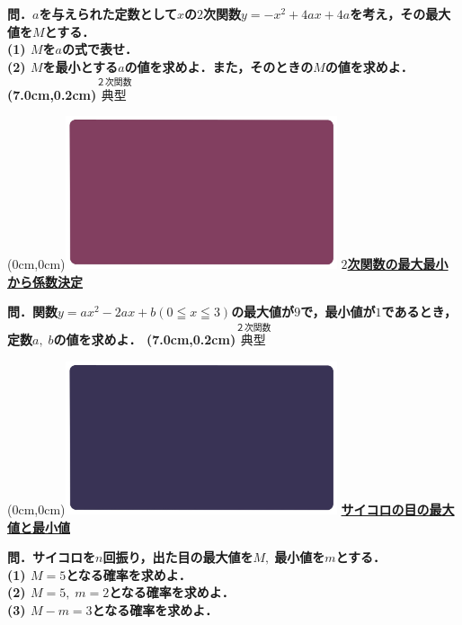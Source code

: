 \documentclass[10pt,
fleqn,
dvipdfmx,
uplatex
]{jsarticle}
\begin{document}
\normalsize 
\bf\boldmath 問．$a$を与えられた定数として$x$の$2$次関数$y=-x^2+4ax+4a$を考え，その最大値を$M$とする．\\
(1)  $M$を$a$の式で表せ．\\
(2)  $M$を最小とする$a$の値を求めよ．また，そのときの$M$の値を求めよ．\\

\at(7.0cm,0.2cm){\small\color{bradorange}$\overset{\text{２次関数}}{\text{典型}}$}


\newpage



\at(0cm,0cm){\includegraphics[width=8cm,bb=0 0 1920 1080]{./youtube/thumbnails/templates/smart_background/２次関数.jpeg}}
{\color{orange}\bf\boldmath\Large\underline{$2$次関数の最大最小から係数決定}}\vspace{0.3zw}

\LARGE 
\bf\boldmath 問．関数$y=ax^2-2ax+b\left(0\leqq x\leqq 3\right)$の最大値が$9$で，最小値が$1$であるとき，定数$a,\;b$の値を求めよ．
\at(7.0cm,0.2cm){\small\color{bradorange}$\overset{\text{２次関数}}{\text{典型}}$}


\newpage



\at(0cm,0cm){\includegraphics[width=8cm,bb=0 0 1920 1080]{./youtube/thumbnails/templates/smart_background/確率.jpeg}}
{\color{orange}\bf\boldmath\Large\underline{サイコロの目の最大値と最小値}}\vspace{0.3zw}

\large 
\bf\boldmath 問．サイコロを$n$回振り，出た目の最大値を$M,\;$最小値を$m$とする．\\
(1)  $M=5$となる確率を求めよ．\\
(2)  $M=5,\;m=2$となる確率を求めよ．\\
(3)  $M-m=3$となる確率を求めよ．\\
\end{document}
